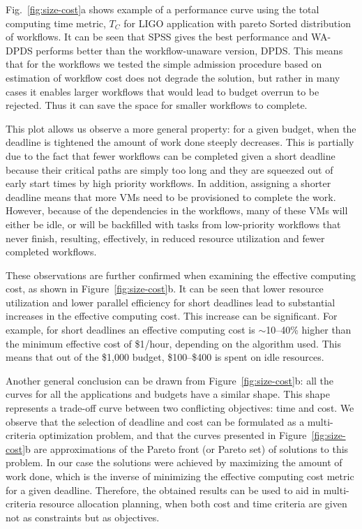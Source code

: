 \documentclass[conference]{IEEEtran}
\begin{document}
Fig.~\ref{fig:size-cost}a shows example of a performance curve using the total computing
time metric, $T_C$ for LIGO application with pareto Sorted distribution of
workflows. It can be seen that SPSS gives the best performance and WA-DPDS
performs better than the workflow-unaware version, DPDS.
This means that for the workflows we tested the simple admission procedure based
on estimation of workflow cost does not degrade the solution, but rather in
many cases it enables larger workflows that would lead to budget overrun to
be rejected. Thus it can save the space for smaller workflows to complete.


This plot allows us observe a more general property: for a given budget,
when the deadline is tightened the amount of work done steeply decreases.
This is partially due to the fact that fewer workflows can be
completed given a short deadline because their critical paths are simply too long
and they are squeezed out of early start times by high priority workflows.
In addition, assigning a shorter deadline means that more VMs need to be
provisioned to complete the work. However, because of the dependencies in the
workflows, many of these VMs will either be idle, or will be backfilled with
tasks from low-priority workflows that never finish, resulting, effectively,
in reduced resource utilization and fewer completed workflows.

These observations are further confirmed when examining the effective computing
cost, as shown in Figure~\ref{fig:size-cost}b. It can be seen that lower
resource utilization and lower parallel efficiency for short deadlines lead to
substantial increases in the effective computing cost. This increase can be
significant. For example, for short deadlines an effective computing cost
is $\sim$10--40\% higher than the minimum effective cost of \$1/hour, depending
on the algorithm used. This means that out of the \$1,000 budget, \$100--\$400
is spent on idle resources.

Another general conclusion can be drawn from Figure~\ref{fig:size-cost}b:
all the curves for all the applications and budgets have a similar shape. This
shape represents a trade-off curve between two conflicting objectives: time and cost.
We observe that the selection of deadline and cost can be formulated as a
multi-criteria optimization problem, and that the curves presented in
Figure~\ref{fig:size-cost}b are approximations of the Pareto front (or Pareto
set) of solutions to this problem. In our case the solutions were achieved by maximizing
the amount of work done, which is the inverse of minimizing the effective
computing cost metric for a given deadline. Therefore, the obtained results
can be used to aid in multi-criteria resource allocation planning, when both
cost and time criteria are given not as constraints but as objectives.
\end{document}
